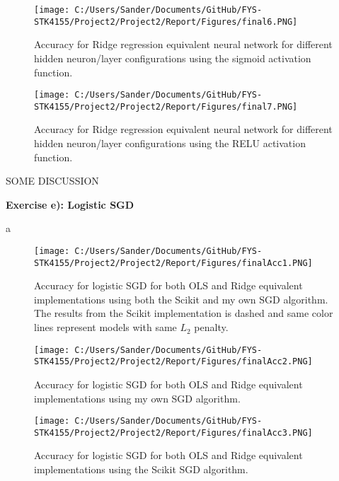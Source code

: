 \documentclass[12pt,a4paper]{article}
\begin{document}
\begin{figure}[H]
\centering
\texttt{[image: C:/Users/Sander/Documents/GitHub/FYS-STK4155/Project2/Project2/Report/Figures/final6.PNG]}
\caption{\label{fig:AccvsLrate6} Accuracy for Ridge regression equivalent neural network for different hidden neuron/layer configurations using the sigmoid activation function.}
\end{figure}

\begin{figure}[H]
\centering
\texttt{[image: C:/Users/Sander/Documents/GitHub/FYS-STK4155/Project2/Project2/Report/Figures/final7.PNG]}
\caption{\label{fig:AccvsLrate7} Accuracy for Ridge regression equivalent neural network for different hidden neuron/layer configurations using the RELU activation function.}
\end{figure}

\noindent SOME DISCUSSION

\newpage

\begin{center}
\Large{\textbf{Exercise e): Logistic SGD}}
\end{center}

\noindent a

\begin{figure}[H]
\centering
\texttt{[image: C:/Users/Sander/Documents/GitHub/FYS-STK4155/Project2/Project2/Report/Figures/finalAcc1.PNG]}
\caption{\label{fig:finalAcc1} Accuracy for logistic SGD for both OLS and Ridge equivalent implementations using both the Scikit and my own SGD algorithm. The results from the Scikit implementation is dashed and same color lines represent models with same $L_2$ penalty.}
\end{figure}

\begin{figure}[H]
\centering
\texttt{[image: C:/Users/Sander/Documents/GitHub/FYS-STK4155/Project2/Project2/Report/Figures/finalAcc2.PNG]}
\caption{\label{fig:finalAcc2} Accuracy for logistic SGD for both OLS and Ridge equivalent implementations using my own SGD algorithm.}
\end{figure}

\begin{figure}[H]
\centering
\texttt{[image: C:/Users/Sander/Documents/GitHub/FYS-STK4155/Project2/Project2/Report/Figures/finalAcc3.PNG]}
\caption{\label{fig:finalAcc3} Accuracy for logistic SGD for both OLS and Ridge equivalent implementations using the Scikit SGD algorithm.}
\end{figure}
\end{document}
